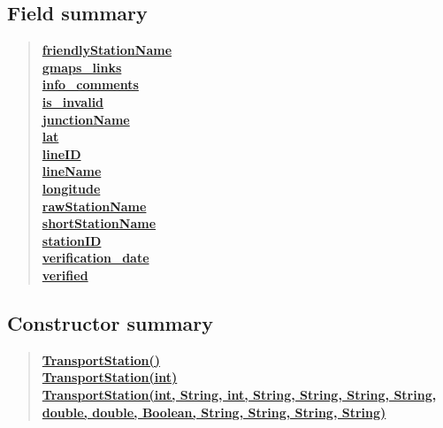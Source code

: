 \documentclass[11pt,a4paper]{report}
\begin{document}
{{{{{{{{{{{{{{{{{{\subsection{Field summary}{
\begin{verse}
\hyperlink{models.TransportStation.friendlyStationName}{{\bf friendlyStationName}} \\
\hyperlink{models.TransportStation.gmaps_links}{{\bf gmaps\_links}} \\
\hyperlink{models.TransportStation.info_comments}{{\bf info\_comments}} \\
\hyperlink{models.TransportStation.is_invalid}{{\bf is\_invalid}} \\
\hyperlink{models.TransportStation.junctionName}{{\bf junctionName}} \\
\hyperlink{models.TransportStation.lat}{{\bf lat}} \\
\hyperlink{models.TransportStation.lineID}{{\bf lineID}} \\
\hyperlink{models.TransportStation.lineName}{{\bf lineName}} \\
\hyperlink{models.TransportStation.longitude}{{\bf longitude}} \\
\hyperlink{models.TransportStation.rawStationName}{{\bf rawStationName}} \\
\hyperlink{models.TransportStation.shortStationName}{{\bf shortStationName}} \\
\hyperlink{models.TransportStation.stationID}{{\bf stationID}} \\
\hyperlink{models.TransportStation.verification_date}{{\bf verification\_date}} \\
\hyperlink{models.TransportStation.verified}{{\bf verified}} \\
\end{verse}
}
\subsection{Constructor summary}{
\begin{verse}
\hyperlink{models.TransportStation()}{{\bf TransportStation()}} \\
\hyperlink{models.TransportStation(int)}{{\bf TransportStation(int)}} \\
\hyperlink{models.TransportStation(int, java.lang.String, int, java.lang.String, java.lang.String, java.lang.String, java.lang.String, double, double, java.lang.Boolean, java.lang.String, java.lang.String, java.lang.String, java.lang.String)}{{\bf TransportStation(int, String, int, String, String, String, String, double, double, Boolean, String, String, String, String)}} \\
\end{verse}
}
}}}}}}}}}}}}}}}}}}
\end{document}
